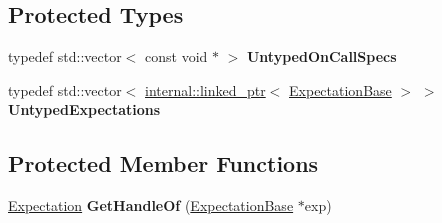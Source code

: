 \subsection*{Protected Types}
\begin{DoxyCompactItemize}
\item 
\mbox{\label{classtesting_1_1internal_1_1_untyped_function_mocker_base_a29cc87ed60ad0218432aa777abba7dbb}} 
typedef std\+::vector$<$ const void $\ast$ $>$ {\bfseries Untyped\+On\+Call\+Specs}
\item 
\mbox{\label{classtesting_1_1internal_1_1_untyped_function_mocker_base_a36480bd395e110b4eae5b0d0402de966}} 
typedef std\+::vector$<$ \mbox{\hyperlink{classtesting_1_1internal_1_1linked__ptr}{internal\+::linked\+\_\+ptr}}$<$ \mbox{\hyperlink{classtesting_1_1internal_1_1_expectation_base}{Expectation\+Base}} $>$ $>$ {\bfseries Untyped\+Expectations}
\end{DoxyCompactItemize}
\subsection*{Protected Member Functions}
\begin{DoxyCompactItemize}
\item 
\mbox{\label{classtesting_1_1internal_1_1_untyped_function_mocker_base_a7705611c4a63df16cddb0674878c403a}} 
\mbox{\hyperlink{classtesting_1_1_expectation}{Expectation}} {\bfseries Get\+Handle\+Of} (\mbox{\hyperlink{classtesting_1_1internal_1_1_expectation_base}{Expectation\+Base}} $\ast$exp)
\end{DoxyCompactItemize}
